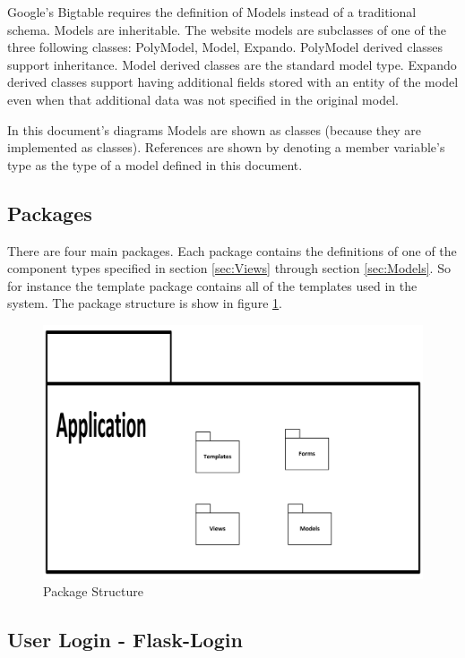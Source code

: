 \documentclass{article}
\begin{document}
Google's Bigtable requires the definition of Models instead of a traditional schema. Models are inheritable. The website models are subclasses of one of the three following classes: PolyModel, Model, Expando. PolyModel derived classes support inheritance. Model derived classes are the standard model type. Expando derived classes support having additional fields stored with an entity of the model even when that additional data was not specified in the original model.

In this document's diagrams Models are shown as classes (because they are implemented as classes). References are shown by denoting a member variable's type as the type of a model defined in this document.

\subsection{Packages}

There are four main packages. Each package contains the definitions of one of the component types specified in section \ref{sec:Views} through section \ref{sec:Models}. So for instance the template package contains all of the templates used in the system. The package structure is show in figure \ref{fig:PackageStructure}.

\FloatBarrier
\begin{figure}[h1]
\centering
\includegraphics[scale=.75]{img/applicationStructure}
\caption{Package Structure}
\label{fig:PackageStructure}
\end{figure}
\FloatBarrier

\subsection{User Login - Flask-Login}
\end{document}

